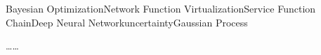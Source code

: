 
\begin{Eabstract}{Bayesian Optimization}{Network Function Virtualization}{Service Function Chain}{Deep Neural 
Network}{uncertainty}{Gaussian Process}


……
\end{Eabstract}
